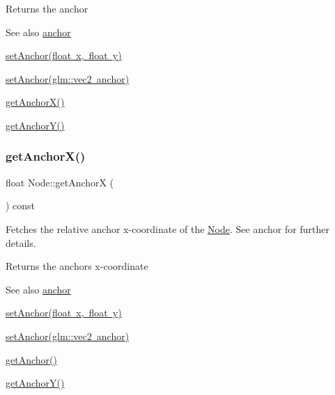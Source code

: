\begin{DoxyReturn}{Returns}
the anchor 
\end{DoxyReturn}
\begin{DoxySeeAlso}{See also}
\mbox{\hyperlink{classsage_1_1Node_a0956f07efec6dcbd3cf796a9028b9175}{anchor}} 

\mbox{\hyperlink{classsage_1_1Node_a8813a645a74f6ab59b25d434e65035c6}{set\+Anchor(float x, float y)}} 

\mbox{\hyperlink{classsage_1_1Node_a957a7e578660950b8518926239397ea0}{set\+Anchor(glm\+::vec2 anchor)}} 

\mbox{\hyperlink{classsage_1_1Node_aa5f31c33d60b32b618d3beaf4e5c6c51}{get\+Anchor\+X()}} 

\mbox{\hyperlink{classsage_1_1Node_a78c5f86d0081854603178fb52d8c0a9b}{get\+Anchor\+Y()}} 
\end{DoxySeeAlso}
\mbox{\label{classsage_1_1Node_aa5f31c33d60b32b618d3beaf4e5c6c51}} 
\subsubsection{\texorpdfstring{getAnchorX()}{getAnchorX()}}
{\footnotesize\ttfamily float Node\+::get\+AnchorX (\begin{DoxyParamCaption}{ }\end{DoxyParamCaption}) const}



Fetches the relative anchor x-\/coordinate of the \mbox{\hyperlink{classsage_1_1Node}{Node}}. See anchor for further details. 

\begin{DoxyReturn}{Returns}
the anchor\textquotesingle{}s x-\/coordinate 
\end{DoxyReturn}
\begin{DoxySeeAlso}{See also}
\mbox{\hyperlink{classsage_1_1Node_a0956f07efec6dcbd3cf796a9028b9175}{anchor}} 

\mbox{\hyperlink{classsage_1_1Node_a8813a645a74f6ab59b25d434e65035c6}{set\+Anchor(float x, float y)}} 

\mbox{\hyperlink{classsage_1_1Node_a957a7e578660950b8518926239397ea0}{set\+Anchor(glm\+::vec2 anchor)}} 

\mbox{\hyperlink{classsage_1_1Node_a6733949b7b281d78a8bef8beafe1b630}{get\+Anchor()}} 

\mbox{\hyperlink{classsage_1_1Node_a78c5f86d0081854603178fb52d8c0a9b}{get\+Anchor\+Y()}} 
\end{DoxySeeAlso}
\mbox{\label{classsage_1_1Node_a78c5f86d0081854603178fb52d8c0a9b}} 
